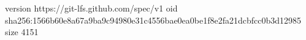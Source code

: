 version https://git-lfs.github.com/spec/v1
oid sha256:1566b60e8a67a9ba9c94980e31c4556bae0ea0be1f8e2fa21dcbfcc0b3d12985
size 4151
